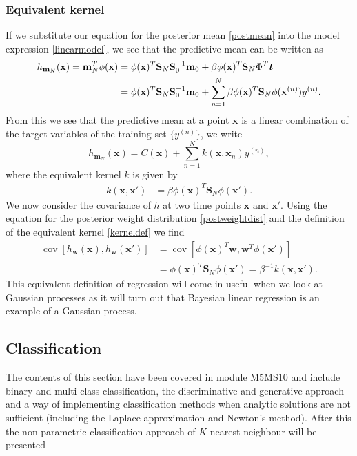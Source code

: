 \documentclass[english]{article}
\begin{document}
\subsubsection{Equivalent kernel}
If we substitute our equation for the posterior mean \ref{postmean} into the model expression \ref{linearmodel}, we see that the predictive mean can be written as
\begin{align}
	h_{\textbf{m}_N} (\textbf{x}) = \textbf{m}_N^T \phi(\textbf{x}) &= \phi(\textbf{x})^T\textbf{S}_N\textbf{S}_0^{-1}\textbf{m}_0 + \beta \phi(\textbf{x})^T \textbf{S}_N\Phi^T\textbf{\textit{t}} \nonumber \\
	&= \phi(\textbf{x})^T\textbf{S}_N\textbf{S}_0^{-1}\textbf{m}_0 + \sum_{n=1}^N \beta \phi(\textbf{x})^T \textbf{S}_N\phi(\textbf{x}^{(n)}){{y^{(n)}}}.
\end{align}
From this we see that the predictive mean at a point $\textbf{x}$ is a linear combination of the target variables of the training set $\{y^{(n)}\}$, we write
\begin{equation}
	h_{\textbf{m}_N} (\textbf{x})= C(\textbf{x}) + \sum_{n=1}^N k(\textbf{x},\textbf{x}_n)y^{(n)},
\end{equation}
where the equivalent kernel $k$ is given by
\begin{align} \label{kerneldef}
	k(\textbf{x}, \textbf{x}') &= \beta\phi(\textbf{x})^T \textbf{S}_N\phi(\textbf{x}').
\end{align}
We now consider the covariance of $h$ at two time points $\textbf{x}$ and $\textbf{x}'$. Using the equation for the posterior weight distribution \ref{postweightdist} and the definition of the equivalent kernel \ref{kerneldef} we find
\begin{align}
	\operatorname{cov}[h_\textbf{w}(\textbf{x}), h_\textbf{w}(\textbf{x}')] &= \operatorname{cov}[\phi(\textbf{x})^T\textbf{w}, \textbf{w}^T\phi(\textbf{x}')] \nonumber\\
	&= \phi(\textbf{x})^T\textbf{S}_N \phi(\textbf{x}') = \beta^{-1}k(\textbf{x}, \textbf{x}').
\end{align}
This equivalent definition of regression will come in useful when we look at Gaussian processes as it will turn out that Bayesian linear regression is an example of a Gaussian process.
\subsection{Classification}
The contents of this section have been covered in module M5MS10 and include binary and multi-class classification, the discriminative and generative approach and a way of implementing classification methods when analytic solutions are not sufficient (including the Laplace approximation and Newton's method). After this the non-parametric classification approach of $K$-nearest neighbour will be presented 
\end{document}
